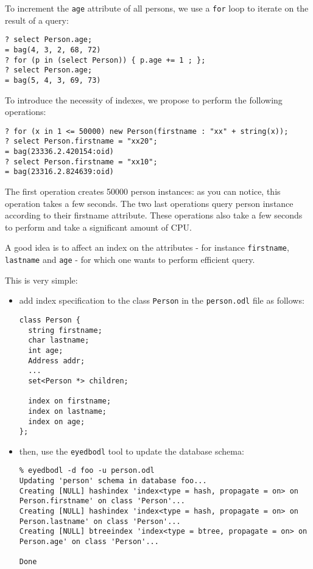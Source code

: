 To increment the \texttt{age} attribute of all persons, we use a \texttt{for} loop to iterate on the result of a query:
\verbsize \begin{verbatim}
? select Person.age;
= bag(4, 3, 2, 68, 72)
? for (p in (select Person)) { p.age += 1 ; };
? select Person.age;
= bag(5, 4, 3, 69, 73)
\end{verbatim}
\normalsize




To introduce the necessity of indexes, we propose to perform the following
operations:
\verbsize \begin{verbatim}
? for (x in 1 <= 50000) new Person(firstname : "xx" + string(x));
? select Person.firstname = "xx20";
= bag(23336.2.420154:oid)
? select Person.firstname = "xx10";
= bag(23316.2.824639:oid)
\end{verbatim}
\normalsize

The first operation creates 50000 person instances: as you can notice,
this operation takes a few seconds. The two last operations query 
person instance according to their firstname attribute. These operations
also take a few seconds to perform and take a significant amount of CPU.

A good idea is to affect an index on the attributes - for instance
\texttt{firstname}, \texttt{lastname} and \texttt{age} - for which one wants
to perform efficient query.

This is very simple:
\begin{itemize}
\item add index specification to the class \texttt{Person} in 
the \texttt{person.odl} file as follows:
\verbsize \begin{verbatim}
class Person {
  string firstname;
  char lastname;
  int age;
  Address addr;
  ...
  set<Person *> children;

  index on firstname;
  index on lastname;
  index on age;
};
\end{verbatim}
\normalsize
\item then, use the \texttt{eyedbodl} tool to update the database schema:
\verbsize \begin{verbatim}
% eyedbodl -d foo -u person.odl
Updating 'person' schema in database foo...
Creating [NULL] hashindex 'index<type = hash, propagate = on> on Person.firstname' on class 'Person'...
Creating [NULL] hashindex 'index<type = hash, propagate = on> on Person.lastname' on class 'Person'...
Creating [NULL] btreeindex 'index<type = btree, propagate = on> on Person.age' on class 'Person'...

Done
\end{verbatim}
\normalsize
\end{itemize}

